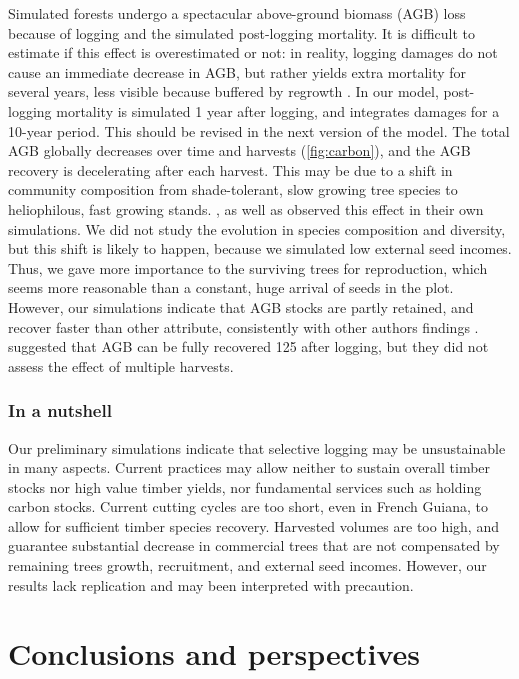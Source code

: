 \documentclass[12pt,]{article}
\let\oldsection\section
\renewcommand\section{\newpage\oldsection}
\theoremstyle{definition}
\theoremstyle{definition}
\theoremstyle{definition}
\theoremstyle{remark}
\begin{document}
Simulated forests undergo a spectacular above-ground biomass (AGB) loss
because of logging and the simulated post-logging mortality. It is
difficult to estimate if this effect is overestimated or not: in
reality, logging damages do not cause an immediate decrease in AGB, but
rather yields extra mortality for several years, less visible because
buffered by regrowth \citep[see][]{Piponiot2016}. In our model,
post-logging mortality is simulated 1 year after logging, and integrates
damages for a 10-year period. This should be revised in the next version
of the model. The total AGB globally decreases over time and harvests
(\ref{fig:carbon}), and the AGB recovery is decelerating after each
harvest. This may be due to a shift in community composition from
shade-tolerant, slow growing tree species to heliophilous, fast growing
stands. \citet{Huth2003}, as well as \citet{Valle2007} observed this
effect in their own simulations. We did not study the evolution in
species composition and diversity, but this shift is likely to happen,
because we simulated low external seed incomes. Thus, we gave more
importance to the surviving trees for reproduction, which seems more
reasonable than a constant, huge arrival of seeds in the plot. However,
our simulations indicate that AGB stocks are partly retained, and
recover faster than other attribute, consistently with other authors
findings \citep{Rutishauser2015}. \citet{Sist2015} suggested that AGB
can be fully recovered 125 after logging, but they did not assess the
effect of multiple harvests.

\subsubsection{In a nutshell}\label{in-a-nutshell}

Our preliminary simulations indicate that selective logging may be
unsustainable in many aspects. Current practices may allow neither to
sustain overall timber stocks nor high value timber yields, nor
fundamental services such as holding carbon stocks. Current cutting
cycles are too short, even in French Guiana, to allow for sufficient
timber species recovery. Harvested volumes are too high, and guarantee
substantial decrease in commercial trees that are not compensated by
remaining trees growth, recruitment, and external seed incomes. However,
our results lack replication and may been interpreted with precaution.

\section{Conclusions and
perspectives}\label{conclusions-and-perspectives}
\end{document}
